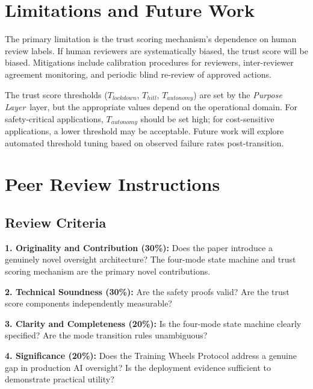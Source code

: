 \documentclass[12pt]{article}
\newcommand{\purpose}{\textit{Purpose Layer}}
\begin{document}
\section{Limitations and Future Work}
\label{sec:limitations}

The primary limitation is the trust scoring mechanism's dependence on human review labels. If human reviewers are systematically biased, the trust score will be biased. Mitigations include calibration procedures for reviewers, inter-reviewer agreement monitoring, and periodic blind re-review of approved actions.

The trust score thresholds ($T_{lockdown}$, $T_{hitl}$, $T_{autonomy}$) are set by the \purpose\ layer, but the appropriate values depend on the operational domain. For safety-critical applications, $T_{autonomy}$ should be set high; for cost-sensitive applications, a lower threshold may be acceptable. Future work will explore automated threshold tuning based on observed failure rates post-transition.

\section*{Peer Review Instructions}
\label{sec:peer-review}

\subsection*{Review Criteria}

\textbf{1. Originality and Contribution (30\%):} Does the paper introduce a genuinely novel oversight architecture? The four-mode state machine and trust scoring mechanism are the primary novel contributions.

\textbf{2. Technical Soundness (30\%):} Are the safety proofs valid? Are the trust score components independently measurable?

\textbf{3. Clarity and Completeness (20\%):} Is the four-mode state machine clearly specified? Are the mode transition rules unambiguous?

\textbf{4. Significance (20\%):} Does the Training Wheels Protocol address a genuine gap in production AI oversight? Is the deployment evidence sufficient to demonstrate practical utility?

\end{document}
